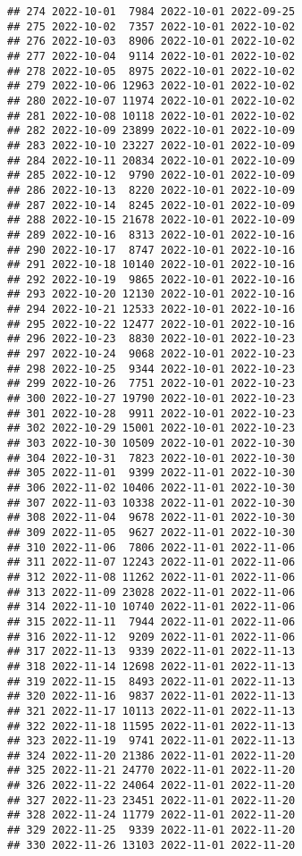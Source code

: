 \documentclass[
]{article}
\begin{document}
\begin{verbatim}
## 274 2022-10-01  7984 2022-10-01 2022-09-25
## 275 2022-10-02  7357 2022-10-01 2022-10-02
## 276 2022-10-03  8906 2022-10-01 2022-10-02
## 277 2022-10-04  9114 2022-10-01 2022-10-02
## 278 2022-10-05  8975 2022-10-01 2022-10-02
## 279 2022-10-06 12963 2022-10-01 2022-10-02
## 280 2022-10-07 11974 2022-10-01 2022-10-02
## 281 2022-10-08 10118 2022-10-01 2022-10-02
## 282 2022-10-09 23899 2022-10-01 2022-10-09
## 283 2022-10-10 23227 2022-10-01 2022-10-09
## 284 2022-10-11 20834 2022-10-01 2022-10-09
## 285 2022-10-12  9790 2022-10-01 2022-10-09
## 286 2022-10-13  8220 2022-10-01 2022-10-09
## 287 2022-10-14  8245 2022-10-01 2022-10-09
## 288 2022-10-15 21678 2022-10-01 2022-10-09
## 289 2022-10-16  8313 2022-10-01 2022-10-16
## 290 2022-10-17  8747 2022-10-01 2022-10-16
## 291 2022-10-18 10140 2022-10-01 2022-10-16
## 292 2022-10-19  9865 2022-10-01 2022-10-16
## 293 2022-10-20 12130 2022-10-01 2022-10-16
## 294 2022-10-21 12533 2022-10-01 2022-10-16
## 295 2022-10-22 12477 2022-10-01 2022-10-16
## 296 2022-10-23  8830 2022-10-01 2022-10-23
## 297 2022-10-24  9068 2022-10-01 2022-10-23
## 298 2022-10-25  9344 2022-10-01 2022-10-23
## 299 2022-10-26  7751 2022-10-01 2022-10-23
## 300 2022-10-27 19790 2022-10-01 2022-10-23
## 301 2022-10-28  9911 2022-10-01 2022-10-23
## 302 2022-10-29 15001 2022-10-01 2022-10-23
## 303 2022-10-30 10509 2022-10-01 2022-10-30
## 304 2022-10-31  7823 2022-10-01 2022-10-30
## 305 2022-11-01  9399 2022-11-01 2022-10-30
## 306 2022-11-02 10406 2022-11-01 2022-10-30
## 307 2022-11-03 10338 2022-11-01 2022-10-30
## 308 2022-11-04  9678 2022-11-01 2022-10-30
## 309 2022-11-05  9627 2022-11-01 2022-10-30
## 310 2022-11-06  7806 2022-11-01 2022-11-06
## 311 2022-11-07 12243 2022-11-01 2022-11-06
## 312 2022-11-08 11262 2022-11-01 2022-11-06
## 313 2022-11-09 23028 2022-11-01 2022-11-06
## 314 2022-11-10 10740 2022-11-01 2022-11-06
## 315 2022-11-11  7944 2022-11-01 2022-11-06
## 316 2022-11-12  9209 2022-11-01 2022-11-06
## 317 2022-11-13  9339 2022-11-01 2022-11-13
## 318 2022-11-14 12698 2022-11-01 2022-11-13
## 319 2022-11-15  8493 2022-11-01 2022-11-13
## 320 2022-11-16  9837 2022-11-01 2022-11-13
## 321 2022-11-17 10113 2022-11-01 2022-11-13
## 322 2022-11-18 11595 2022-11-01 2022-11-13
## 323 2022-11-19  9741 2022-11-01 2022-11-13
## 324 2022-11-20 21386 2022-11-01 2022-11-20
## 325 2022-11-21 24770 2022-11-01 2022-11-20
## 326 2022-11-22 24064 2022-11-01 2022-11-20
## 327 2022-11-23 23451 2022-11-01 2022-11-20
## 328 2022-11-24 11779 2022-11-01 2022-11-20
## 329 2022-11-25  9339 2022-11-01 2022-11-20
## 330 2022-11-26 13103 2022-11-01 2022-11-20

\end{verbatim}
\end{document}
